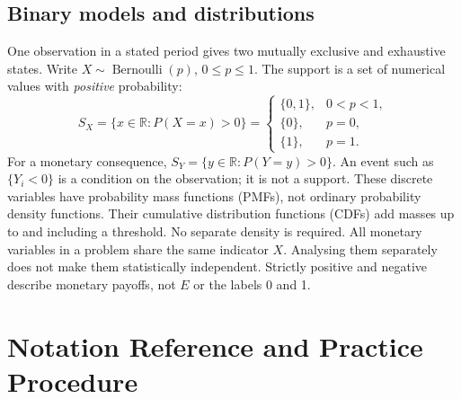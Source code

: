 \subsection{Binary models and distributions}
One observation in a stated period gives two mutually exclusive and exhaustive
states. Write $X\sim\operatorname{Bernoulli}(p)$, $0\leq p\leq1$.
The support is a set of numerical values with \emph{positive} probability:
\[
 S_X=\{x\in\mathbb R:P(X=x)>0\}
 =\begin{cases}\{0,1\},&0<p<1,\\\{0\},&p=0,\\\{1\},&p=1.\end{cases}
\]
For a monetary consequence, $S_Y=\{y\in\mathbb R:P(Y=y)>0\}$.
An event such as $\{Y_i<0\}$ is a condition on the observation; it is not a support.
These discrete variables have probability mass functions (PMFs), not ordinary
probability density functions. Their cumulative distribution functions (CDFs)
add masses up to and including a threshold. No separate density is required.
All monetary variables in a problem share the same indicator $X$.
Analysing them separately does not make them statistically independent.
Strictly positive and negative describe monetary payoffs, not $E$ or the labels 0 and 1.

\clearpage\section{Notation Reference and Practice Procedure}\label{sec:t2-c3-notation}
